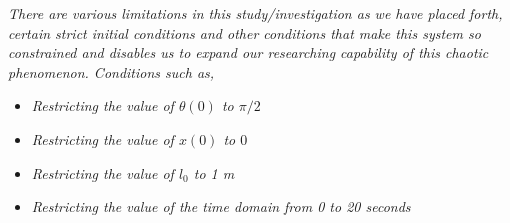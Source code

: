 \textit{There are various limitations in this study/investigation as we have placed forth, certain strict initial conditions and other conditions that make this system so constrained and disables us to expand our researching capability of this chaotic phenomenon. Conditions such as,}
        
    \begin{itemize}
        \item \textit{Restricting the value of $\theta(0)$ to $\pi/2$}
        \item \textit{Restricting the value of $x(0)$ to $0$}
        \item \textit{Restricting the value of $l_0$ to 1 m}
        \item \textit{Restricting the value of the time domain from 0 to 20 seconds}
    \end{itemize}
        
        

 